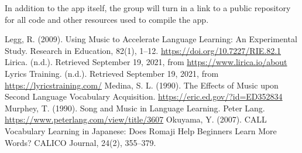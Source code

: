 \documentclass[conference, 12pt]{IEEEtran}
\begin{document}
In addition to the app itself, the group will turn in a link to a public repository for all code and other resources used to compile the app.

\begin{thebibliography}{00}
 Legg, R. (2009). Using Music to Accelerate Language Learning: An Experimental Study. Research in Education, 82(1), 1--12. \url{https://doi.org/10.7227/RIE.82.1}
 Lirica. (n.d.). Retrieved September 19, 2021, from \url{https://www.lirica.io/about}
 Lyrics Training. (n.d.). Retrieved September 19, 2021, from \url{https://lyricstraining.com/}
 Medina, S. L. (1990). The Effects of Music upon Second Language Vocabulary Acquisition. \url{https://eric.ed.gov/?id=ED352834}
 Murphey, T. (1990). Song and Music in Language Learning. Peter Lang. \url{https://www.peterlang.com/view/title/3607}
 Okuyama, Y. (2007). CALL Vocabulary Learning in Japanese: Does Romaji Help Beginners Learn More Words? CALICO Journal, 24(2), 355--379.
\end{thebibliography}
\end{document}
